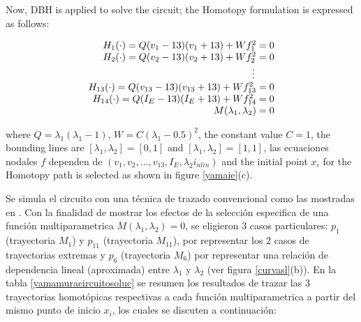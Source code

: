 \documentclass[conference,letterpaper,twocolumn]{IEEEtran}
\begin{document}
Now, DBH is applied to solve the circuit; the Homotopy formulation is expressed as follows:


\begin{displaymath}
{\small
\begin{array}{r}
H_1(\cdot)=Q(v_1-13)(v_1+13)+ W f_1^2=0\\
H_2(\cdot)=Q(v_2-13)(v_2+13)+ W f_2^2=0\\
\vdots \qquad \\
H_{13}(\cdot)=Q(v_{13}-13)(v_{13}+13)+ W f_{13}^2=0\\
H_{14}(\cdot)=Q(I_E-13)(I_E+13)+ W f_{14}^2=0\\
M(\lambda_1,\lambda_2)=0
\end{array}}
\end{displaymath}


where $Q=\lambda_1(\lambda_1-1)$, $W=C(\lambda_1-0.5)^2 $, the constant value $C=1$, the bounding lines are $[\lambda_1,\lambda_2]=[0,1]$ and $[\lambda_1,\lambda_2]=[1,1]$, las ecuaciones nodales $f$ dependen de $(v_1,v_2,\hdots,v_{13},I_E,\lambda_2i_{nlin})$ and the initial point $x_i$ for the Homotopy path is selected as shown in figure \ref{yamaie}(c).

Se simula el circuito con una técnica de trazado convencional como las mostradas en \cite{homo_allgower}.
Con la finalidad de mostrar los efectos de la selección especifica de una función multiparametrica $M(\lambda_1,\lambda_2)=0$, se eligieron
3 casos particulares: $p_1$ (trayectoria $M_1$) y $p_{11}$ (trayectoria $M_{11}$), por representar los 2 casos de trayectorias extremas y $p_6$ (trayectoria $M_6$)
por representar una relación de dependencia lineal (aproximada) entre $\lambda_1$ y $\lambda_2$ (ver figura \ref{curvasl}(b)). 
En la tabla \ref{yamamuracircuitosoluc} se resumen los resultados de trazar las 3 trayectorias homotópicas respectivas
a cada función multiparametrica a partir del mismo punto de inicio $x_i$, los cuales se discuten a continuación:
\end{document}
